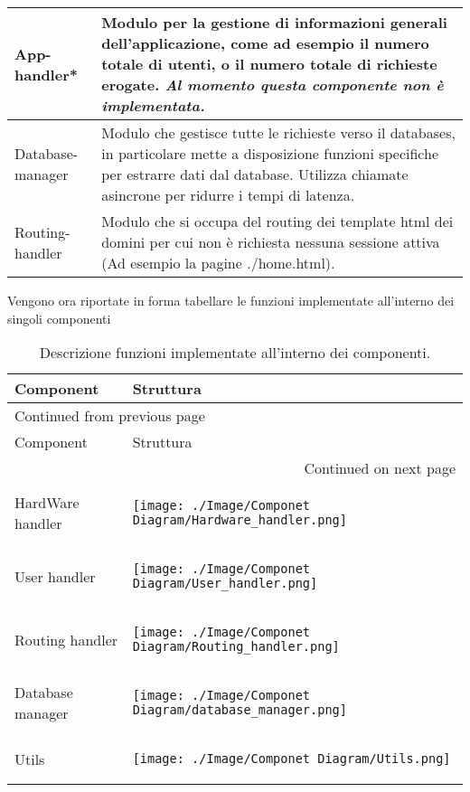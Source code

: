 \documentclass[onecolumn,a4paper]{article}
\begin{document}
\begin{longtable}{|l|p{8.7cm}|}
\hline
App-handler* & Modulo per la gestione di informazioni generali dell'applicazione, come ad esempio il numero totale di utenti, o il numero totale di richieste erogate. \emph{Al momento questa componente non è implementata.}\\
\hline
Database-manager & Modulo che gestisce tutte le richieste verso il databases, in particolare mette a disposizione funzioni specifiche per estrarre dati dal database. Utilizza chiamate asincrone per ridurre i tempi di latenza.\\
\hline
Routing-handler & Modulo che si occupa del routing dei template html dei domini per cui non è richiesta nessuna sessione attiva (Ad esempio la pagine ./home.html).\\
\hline
\end{longtable}


Vengono ora riportate in forma tabellare le funzioni implementate all'interno dei singoli componenti
\begin{longtable}{|l|p{8.6cm}|}
\caption{Descrizione funzioni implementate all'interno dei componenti.}
\\
\hline
Component & Struttura\\
\hline
\endfirsthead
\multicolumn{2}{l}{Continued from previous page} \\
\hline

Component & Struttura \\

\hline
\endhead
\hline\multicolumn{2}{r}{Continued on next page} \\
\endfoot
\endlastfoot
\hline
HardWare handler & \begin{center}
\texttt{[image: ./Image/Componet Diagram/Hardware\_handler.png]}
\end{center}\\
\hline
User handler & \begin{center}
\texttt{[image: ./Image/Componet Diagram/User\_handler.png]}
\end{center}\\
\hline
Routing handler & \begin{center}
\texttt{[image: ./Image/Componet Diagram/Routing\_handler.png]}
\end{center}\\
\hline
Database manager & \begin{center}
\texttt{[image: ./Image/Componet Diagram/database\_manager.png]}
\end{center}\\
\hline
Utils & \begin{center}
\texttt{[image: ./Image/Componet Diagram/Utils.png]}
\end{center}\\
\hline
\end{longtable}
\end{document}

